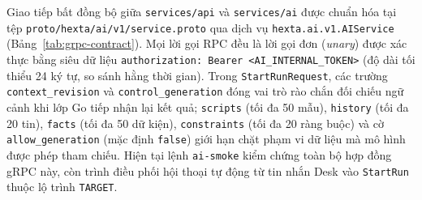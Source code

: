 Giao tiếp bất đồng bộ giữa \texttt{services/\hspace{0pt}api} và \texttt{services/\hspace{0pt}ai} được chuẩn hóa tại tệp \texttt{proto/\hspace{0pt}hexta/\hspace{0pt}ai/\hspace{0pt}v1/\hspace{0pt}service.\hspace{0pt}proto} qua dịch vụ \texttt{hexta.\hspace{0pt}ai.\hspace{0pt}v1.\hspace{0pt}AIService} (Bảng~\ref{tab:grpc-contract}).
Mọi lời gọi RPC đều là lời gọi đơn (\emph{unary}) được xác thực bằng siêu dữ liệu \texttt{authorization: Bearer <AI\_\hspace{0pt}INTERNAL\_\hspace{0pt}TOKEN>} (độ dài tối thiểu 24 ký tự, so sánh hằng thời gian).
Trong \texttt{StartRunRequest}, các trường \texttt{context\_\hspace{0pt}revision} và \texttt{control\_\hspace{0pt}generation} đóng vai trò rào chắn đối chiếu ngữ cảnh khi lớp Go tiếp nhận lại kết quả; \texttt{scripts} (tối đa 50 mẫu), \texttt{history} (tối đa 20 tin), \texttt{facts} (tối đa 50 dữ kiện), \texttt{constraints} (tối đa 20 ràng buộc) và cờ \texttt{allow\_\hspace{0pt}generation} (mặc định \texttt{false}) giới hạn chặt phạm vi dữ liệu mà mô hình được phép tham chiếu.
Hiện tại lệnh \texttt{ai-smoke} kiểm chứng toàn bộ hợp đồng gRPC này, còn trình điều phối hội thoại tự động từ tin nhắn Desk vào \texttt{StartRun} thuộc lộ trình \texttt{TARGET}.

